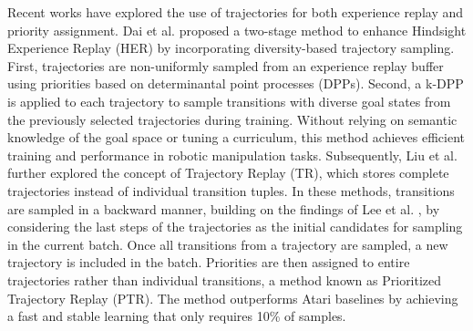 
Recent works have explored the use of trajectories for both experience replay and priority assignment. Dai et al. \cite{dai2021diversity} proposed a two-stage method to enhance Hindsight Experience Replay (HER) by incorporating diversity-based trajectory sampling. First, trajectories are non-uniformly sampled from an experience replay buffer using priorities based on determinantal point processes (DPPs). Second, a k-DPP is applied to each trajectory to sample transitions with diverse goal states from the previously selected trajectories during training. Without relying on semantic knowledge of the goal space or tuning a curriculum, this method achieves efficient training and performance in robotic manipulation tasks. Subsequently, Liu et al. \cite{liu2023prioritized} further explored the concept of Trajectory Replay (TR), which stores complete trajectories instead of individual transition tuples. In these methods, transitions are sampled in a backward manner, building on the findings of Lee et al. \cite{lee2019sample}, by considering the last steps of the trajectories as the initial candidates for sampling in the current batch. Once all transitions from a trajectory are sampled, a new trajectory is included in the batch. Priorities are then assigned to entire trajectories rather than individual transitions, a method known as Prioritized Trajectory Replay (PTR). The method outperforms Atari baselines by achieving a fast and stable learning that only requires 10\% of samples.



